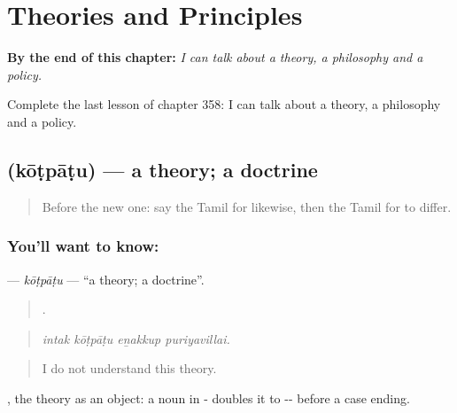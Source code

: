 
\chapter{Theories and Principles}
\label{ch:ta-theories-and-principles}

\begin{chapteropening}
\textbf{By the end of this chapter:} \emph{I can talk about a theory, a philosophy and a policy.}

Complete the last lesson of chapter 358: I can talk about a theory, a philosophy and a policy.
\end{chapteropening}

\section[\texorpdfstring{\ta{கோட்பாடு} (kōṭpāṭu)}{கோட்பாடு (kōṭpāṭu)}]{ (kōṭpāṭu) — a theory; a doctrine}

\label{lesson:TA-C358-kotpatu}



\begin{quote}
Before the new one: say the Tamil for likewise, then the Tamil for to differ.
\end{quote}

\subsection*{You'll want to know: }
\textbf{} — \emph{kōṭpāṭu} — \textquotedblleft{}a theory; a doctrine\textquotedblright{}.

\begin{quote}
   .
\end{quote}

\begin{quote}
\emph{intak kōṭpāṭu eṉakkup puriyavillai.}
\end{quote}

\begin{quote}
I do not understand this theory.
\end{quote}

, the theory as an object: a noun in - doubles it to -- before a case ending.


